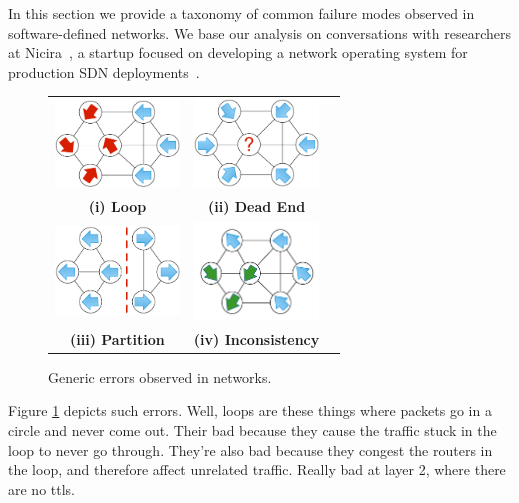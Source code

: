 
In this section we provide a taxonomy of common failure modes observed in
software-defined networks. We base our analysis on conversations with
researchers at Nicira~\cite{nicira}, a startup focused on developing a network operating
system for production SDN deployments~\cite{onix}.

\begin{figure}[t]
    \centering
    \begin{tabular}{ccc}
    \hspace{-5pt}\includegraphics[width=1.3in]{../diagrams/bugs/loop.pdf}&
    \includegraphics[width=1.3in]{../diagrams/bugs/dead_end.pdf}& \\
    {\bf (i) Loop}&{\bf (ii) Dead End}& \\
    \includegraphics[width=1.3in]{../diagrams/bugs/partition.pdf}&
    \includegraphics[width=1.3in]{../diagrams/bugs/routing_inconsistency.pdf}\\
     {\bf (iii) Partition}&{\bf (iv) Inconsistency}
    \end{tabular}
    \caption[]{\label{fig:generic_errors} Generic errors observed in
    networks.\vspace{-10pt}} 
\end{figure}


Figure \ref{fig:generic_errors} depicts such
errors. 
Well, loops are these things where packets go in a circle and never come out.
Their bad because they cause the traffic stuck in the loop to never go
through. They're also bad because they congest the routers in the loop, and
therefore affect unrelated traffic. Really bad at layer 2, where there are no
ttls.


